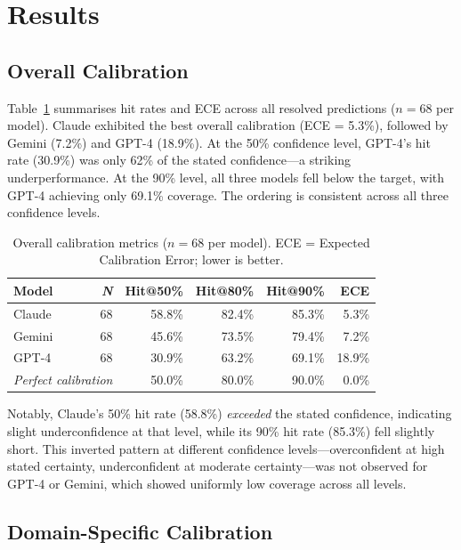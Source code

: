 \documentclass[9pt,twoside,lineno]{pnas-new}
\begin{document}
\section*{Results}

\subsection*{Overall Calibration}

Table~\ref{tab:overall} summarises hit rates and ECE across all resolved predictions ($n = 68$ per model). Claude exhibited the best overall calibration (ECE = 5.3\%), followed by Gemini (7.2\%) and GPT-4 (18.9\%). At the 50\% confidence level, GPT-4's hit rate (30.9\%) was only 62\% of the stated confidence---a striking underperformance. At the 90\% level, all three models fell below the target, with GPT-4 achieving only 69.1\% coverage. The ordering is consistent across all three confidence levels.

\begin{table}[h]
\centering
\caption{Overall calibration metrics ($n = 68$ per model). ECE = Expected Calibration Error; lower is better.}
\label{tab:overall}
\begin{tabular}{lrrrrr}
\hline
\textbf{Model} & \textbf{\textit{N}} & \textbf{Hit@50\%} & \textbf{Hit@80\%} & \textbf{Hit@90\%} & \textbf{ECE} \\
\hline
Claude & 68 & 58.8\% & 82.4\% & 85.3\% & 5.3\% \\
Gemini & 68 & 45.6\% & 73.5\% & 79.4\% & 7.2\% \\
GPT-4 & 68 & 30.9\% & 63.2\% & 69.1\% & 18.9\% \\
\hline
\multicolumn{2}{l}{\textit{Perfect calibration}} & 50.0\% & 80.0\% & 90.0\% & 0.0\% \\
\hline
\end{tabular}
\end{table}

Notably, Claude's 50\% hit rate (58.8\%) \textit{exceeded} the stated confidence, indicating slight underconfidence at that level, while its 90\% hit rate (85.3\%) fell slightly short. This inverted pattern at different confidence levels---overconfident at high stated certainty, underconfident at moderate certainty---was not observed for GPT-4 or Gemini, which showed uniformly low coverage across all levels.

\subsection*{Domain-Specific Calibration}
\end{document}
